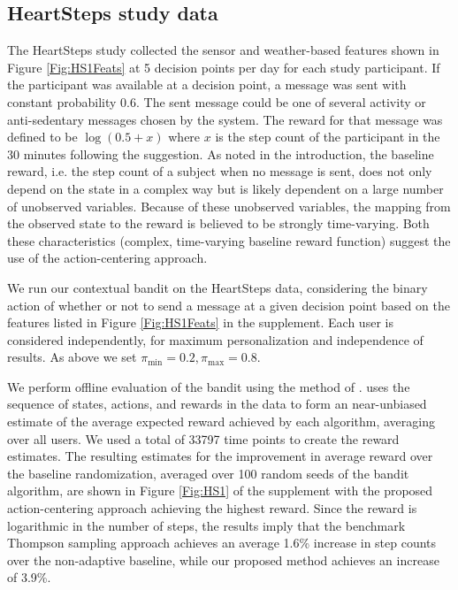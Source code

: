 \documentclass{article}
\begin{document}


\subsection{HeartSteps study data}


The HeartSteps study collected the sensor and weather-based features shown in Figure \ref{Fig:HS1Feats} at 5 decision points per day for each study participant. If the participant was available at a decision point, a message was sent with constant probability 0.6. The sent message could be one of several activity or anti-sedentary messages chosen by the system. The reward for that message was defined to be $\log(0.5 + x)$ where $x$ is the step count of the participant in the 30 minutes following the suggestion. 
As noted in the introduction, the baseline reward, i.e. the step count of a subject when no message is sent, does not only depend on the state in a complex way but is likely dependent on a large number of unobserved variables. Because of these unobserved variables, the mapping from the observed state to the reward is believed to be strongly time-varying. Both these characteristics (complex, time-varying baseline reward function) suggest the use of the action-centering approach. %

We run our contextual bandit on the HeartSteps data, considering the binary action of whether or not to send a message at a given decision point based on the features listed in Figure \ref{Fig:HS1Feats} in the supplement. Each user is considered independently, for maximum personalization and independence of results. As above we set $\pi_{\min} = 0.2, \pi_{\max} = 0.8$. 

We perform offline evaluation of the bandit using the method of \cite{li2011unbiased}. \cite{li2011unbiased} uses the sequence of states, actions, and rewards in the data to form an near-unbiased estimate of the average expected reward achieved by each algorithm, averaging over all users. We used a total of 33797 time points to create the reward estimates. The resulting estimates for the improvement in average reward over the baseline randomization, averaged over 100 random seeds of the bandit algorithm, are shown in Figure \ref{Fig:HS1} of the supplement with the proposed action-centering approach achieving the highest reward. Since the reward is logarithmic in the number of steps, the results imply that the benchmark Thompson sampling approach achieves an average 1.6\% increase in step counts over the non-adaptive baseline, while our proposed method achieves an increase of 3.9\%. 
\end{document}
